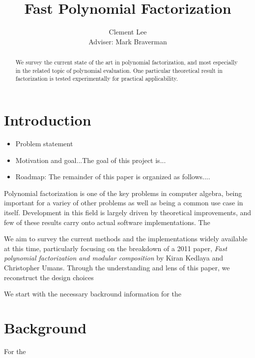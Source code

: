 \documentclass[pageno]{jpaper}
\begin{document}
\title{Fast Polynomial Factorization}

\author{Clement Lee\\Adviser: Mark Braverman}

\date{}
\maketitle

\thispagestyle{empty}
\doublespacing
\begin{abstract}
  We survey the current state of the art in polynomial factorization, and most especially in the related topic of polynomial evaluation.
  One particular theoretical result in factorization is tested experimentally for practical applicability.
\end{abstract}

\section{Introduction}
\begin{itemize}
\item Problem statement 
\item Motivation and goal...The goal of this project is...
\item Roadmap: The remainder of this paper is organized as follows....
\end{itemize}
Polynomial factorization is one of the key problems in computer algebra, being important for a variey of other problems as well as being a common use case in itself.
Development in this field is largely driven by theoretical improvements, and few of these results carry onto actual software implementations.
The 

We aim to survey the current methods and the implementations widely available at this time, particularly focusing on the breakdown of a 2011 paper, \emph{Fast polynomial factorization and modular composition} by Kiran Kedlaya and Christopher Umans.
Through the understanding and lens of this paper, we reconstruct the design choices 


We start with the necessary backround information for the 

\section{Background}
For the 
\end{document}
